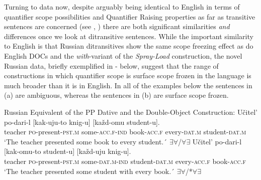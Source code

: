 \documentclass[output=paper,colorlinks,citecolor=brown,modfonts,nonflat]{langsci/langscibook}
\begin{document}
Turning to data now, despite arguably being identical to English in terms of quantifier scope possibilities and Quantifier Raising properties as far as transitive sentences are concerned (see \citealt{Antonyuk-Yudina2006, Antonyuk2015}, \citeyear{Antonyuk2019}) there are both significant similarities \textit{and} differences once we look at ditransitive sentences. While the important similarity to English is that Russian ditransitives show the same scope freezing effect as do English DOCs and the \textit{with}-variant of the \textit{Spray-Load} construction, the novel Russian data, briefly exemplified in - below, suggest that the range of constructions in which quantifier scope is surface scope frozen in the language is much broader than it is in English. In all of the examples below the sentences in (a) are ambiguous, whereas the sentences in (b) are surface scope frozen.

\ea%
    \label{ex:antonyuk:2}
    Russian Equivalent of the PP Dative and the Double-Object Construction:
    \ea \label{ex:antonyuk:2a}
    \gll    Učitel’ po-dari-l [kak-uju-to knig-u] [každ-omu student-u].\\
            teacher \textsc{po-}present\textsc{-pst.m} \hspaceThis{[}some\textsc{-acc.f-ind} book\textsc{-acc.f} \hspaceThis{[}every\textsc{-dat.m} student\textsc{-dat.m}\\
    \glt    `The teacher presented some book to every student.´ 
            \hfill ${\exists}{\forall}$/${\forall}{\exists}$
    \ex \label{ex:antonyuk:2b}
    \gll    Učitel’ po-dari-l [kak-omu-to student-u] [každ-uju knig-u].\\
            teacher \textsc{po-}present\textsc{-pst.m} \hspaceThis{[}some\textsc{-dat.m-ind} student\textsc{-dat.m} \hspaceThis{[}every\textsc{-acc.f} book\textsc{-acc.f}\\
    \glt    `The teacher presented some student with every book.´ 
            \hfill ${\exists}{\forall}$/*${\forall}{\exists}$
    \z
\z
\end{document}
